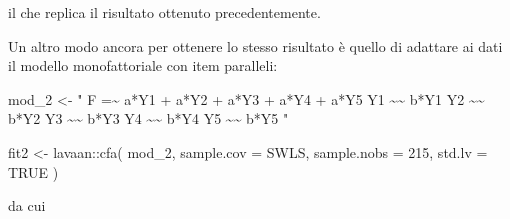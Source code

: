 \documentclass[
  11pt,
]{krantz}
\makeatletter
\newenvironment{Shaded}{\begin{snugshade}}{\end{snugshade}}
\newcommand{\AttributeTok}[1]{\textcolor[rgb]{0.61,0.61,0.61}{#1}}
\newcommand{\CommentTok}[1]{\textcolor[rgb]{0.37,0.37,0.37}{\textit{#1}}}
\newcommand{\ConstantTok}[1]{\textcolor[rgb]{0,0,0}{#1}}
\newcommand{\DecValTok}[1]{\textcolor[rgb]{0.06,0.06,0.06}{#1}}
\newcommand{\FunctionTok}[1]{\textcolor[rgb]{0,0,0}{#1}}
\newcommand{\NormalTok}[1]{#1}
\newcommand{\OtherTok}[1]{\textcolor[rgb]{0.37,0.37,0.37}{#1}}
\newcommand{\SpecialCharTok}[1]{\textcolor[rgb]{0,0,0}{#1}}
\newcommand{\StringTok}[1]{\textcolor[rgb]{0.5,0.5,0.5}{#1}}
\newenvironment{kframe}{%
\medskip{}
\setlength{\fboxsep}{.8em}
 \def\at@end@of@kframe{}%
 \ifinner\ifhmode%
  \def\at@end@of@kframe{\end{minipage}}%
  \begin{minipage}{\columnwidth}%
 \fi\fi%
 \def\FrameCommand##1{\hskip\@totalleftmargin \hskip-\fboxsep
 \colorbox{shadecolor}{##1}\hskip-\fboxsep
     \hskip-\linewidth \hskip-\@totalleftmargin \hskip\columnwidth}%
 \MakeFramed {\advance\hsize-\width
   \@totalleftmargin\z@ \linewidth\hsize
   \@setminipage}}%
 {\par\unskip\endMakeFramed%
 \at@end@of@kframe}
\renewenvironment{Shaded}{\begin{kframe}}{\end{kframe}}
\theoremstyle{definition}
\theoremstyle{definition}
\theoremstyle{definition}
\theoremstyle{definition}
\theoremstyle{remark}
\makeatother
\begin{document}
il che replica il risultato ottenuto precedentemente.

Un altro modo ancora per ottenere lo stesso risultato è quello di adattare ai dati il modello monofattoriale con item paralleli:

\begin{Shaded}
\begin{Highlighting}[]
\NormalTok{mod\_2 }\OtherTok{\textless{}{-}} \StringTok{"}
\StringTok{  F =\textasciitilde{} a*Y1 + a*Y2 + a*Y3 + a*Y4 + a*Y5}
\StringTok{  Y1 \textasciitilde{}\textasciitilde{} b*Y1}
\StringTok{  Y2 \textasciitilde{}\textasciitilde{} b*Y2}
\StringTok{  Y3 \textasciitilde{}\textasciitilde{} b*Y3}
\StringTok{  Y4 \textasciitilde{}\textasciitilde{} b*Y4}
\StringTok{  Y5 \textasciitilde{}\textasciitilde{} b*Y5}
\StringTok{"}
\end{Highlighting}
\end{Shaded}

\begin{Shaded}
\begin{Highlighting}[]
\NormalTok{fit2 }\OtherTok{\textless{}{-}}\NormalTok{ lavaan}\SpecialCharTok{::}\FunctionTok{cfa}\NormalTok{(}
\NormalTok{  mod\_2,}
  \AttributeTok{sample.cov =}\NormalTok{ SWLS,}
  \AttributeTok{sample.nobs =} \DecValTok{215}\NormalTok{,}
  \AttributeTok{std.lv =} \ConstantTok{TRUE}
\NormalTok{)}
\end{Highlighting}
\end{Shaded}

da cui

\begin{Shaded}
\end{Shaded}

\begin{Shaded}
\end{Shaded}
\end{document}
